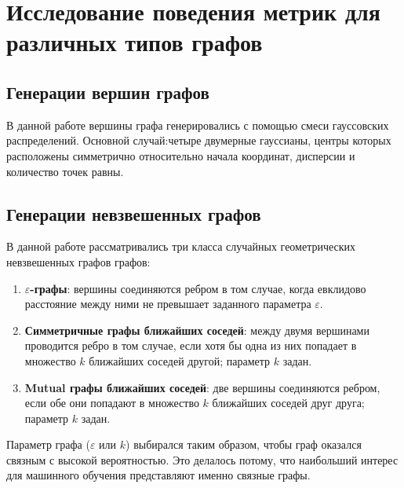 \chapter{Исследование поведения метрик для различных типов графов} \label{chapt2}

\section{Генерации вершин графов} \label{sect2_1}

В данной работе вершины графа генерировались с помощью смеси гауссовских распределений. Основной случай:четыре двумерные гауссианы, центры которых расположены симметрично относительно начала координат, дисперсии и количество точек равны.




\section{Генерации невзвешенных графов} \label{sect2_2}

В данной работе рассматривались три класса случайных геометрических невзвешенных графов графов: 
\begin{enumerate}
  \item \textbf{$\varepsilon$-графы}: вершины соединяются ребром в том случае, когда евклидово расстояние между ними не превышает заданного параметра $\varepsilon$.
  \item \textbf{Симметричные графы ближайших соседей}: между двумя вершинами проводится ребро в том случае, если хотя бы одна из них попадает в множество $k$ ближайших соседей другой; параметр $k$ задан.
  \item \textbf{Mutual графы ближайших соседей}: две вершины соединяются ребром, если обе они попадают в множество $k$ ближайших соседей друг друга; параметр $k$ задан.
\end{enumerate}

Параметр графа ($\varepsilon$ или $k$) выбирался таким образом, чтобы граф оказался связным с высокой вероятностью. Это делалось потому, что наибольший интерес для машинного обучения представляют именно связные графы.


